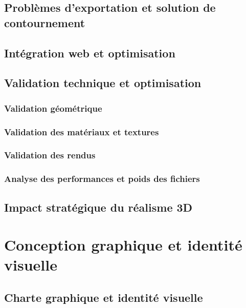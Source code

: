 \subsection{Problèmes d'exportation et solution de contournement}

\subsection{Intégration web et optimisation}

\subsection{Validation technique et optimisation}

\subsubsection{Validation géométrique}

\subsubsection{Validation des matériaux et textures}

\subsubsection{Validation des rendus}

\subsubsection{Analyse des performances et poids des fichiers}

\subsection{Impact stratégique du réalisme 3D}

\section{Conception graphique et identité visuelle}

\subsection{Charte graphique et identité visuelle}

